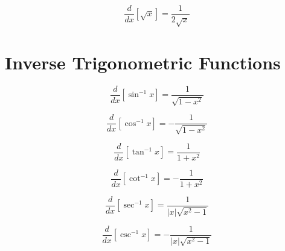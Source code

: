\documentclass[fleqn]{article}
\begin{document}
\begin{multicols}{2}
\[
\frac{d}{dx}[\sqrt{x}] = \frac{1}{2\sqrt{x}}
\]

\section*{Inverse Trigonometric Functions}

\[
\frac{d}{dx}[\sin^{-1} x] = \frac{1}{\sqrt{1 - x^2}}
\]

\[
\frac{d}{dx}[\cos^{-1} x] = -\frac{1}{\sqrt{1 - x^2}}
\]

\[
\frac{d}{dx}[\tan^{-1} x] = \frac{1}{1 + x^2}
\]

\[
\frac{d}{dx}[\cot^{-1} x] = -\frac{1}{1 + x^2}
\]

\[
\frac{d}{dx}[\sec^{-1} x] = \frac{1}{|x|\sqrt{x^2 - 1}}
\]

\[
\frac{d}{dx}[\csc^{-1} x] = -\frac{1}{|x|\sqrt{x^2 - 1}}
\]

\end{multicols}
\end{document}
